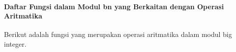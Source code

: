 \clearpage
\paragraph{Daftar Fungsi dalam Modul bn yang Berkaitan dengan Operasi Aritmatika}\label{sec:bn_func_all}

Berikut adalah fungsi yang merupakan operasi aritmatika dalam modul big integer.

